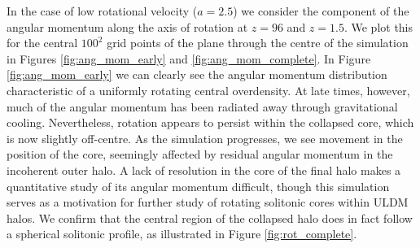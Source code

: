 \documentclass[a4paper,11pt]{article}
\begin{document}
In the case of low rotational velocity ($a = 2.5$) we consider the component of the angular momentum along the axis of rotation at $z = 96$ and $z = 1.5$. We plot this for the central $100^2$ grid points of the plane through the centre of the simulation in Figures \ref{fig:ang_mom_early} and \ref{fig:ang_mom_complete}. In Figure \ref{fig:ang_mom_early} we can clearly see the angular momentum distribution characteristic of a uniformly rotating central overdensity. At late times, however, much of the angular momentum has been radiated away through gravitational cooling. Nevertheless, rotation appears to persist within the collapsed core, which is now slightly off-centre. As the simulation progresses, we see movement in the position of the core, seemingly affected by residual angular momentum in the incoherent outer halo. A lack of resolution in the core of the final halo makes a quantitative study of its angular momentum difficult, though this simulation serves as a motivation for further study of rotating solitonic cores within ULDM halos. We confirm that the central region of the collapsed halo does in fact follow a spherical solitonic profile, as illustrated in Figure \ref{fig:rot_complete}.
\end{document}
